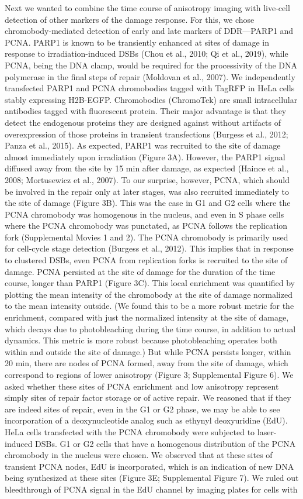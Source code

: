  Next we wanted to combine the time course of anisotropy imaging with live-cell detection of other markers of the damage response. For this, we chose chromobody-mediated detection of early and late markers of DDR—PARP1 and PCNA. PARP1 is known to be transiently enhanced at sites of damage in response to irradiation-induced DSBs (Chou et al., 2010; Qi et al., 2019), while PCNA, being the DNA clamp, would be required for the processivity of the DNA polymerase in the final steps of repair (Moldovan et al., 2007). We independently transfected PARP1 and PCNA chromobodies tagged with TagRFP in HeLa cells stably expressing H2B-EGFP. Chromobodies (ChromoTek) are small intracellular antibodies tagged with fluorescent protein. Their major advantage is that they detect the endogenous proteins they are designed against without artifacts of overexpression of those proteins in transient transfections (Burgess et al., 2012; Panza et al., 2015). As expected, PARP1 was recruited to the site of damage almost immediately upon irradiation (Figure 3A). However, the PARP1 signal diffused away from the site by 15 min after damage, as expected (Haince et al., 2008; Mortusewicz et al., 2007). To our surprise, however, PCNA, which should be involved in the repair only at later stages, was also recruited immediately to the site of damage (Figure 3B). This was the case in G1 and G2 cells where the PCNA chromobody was homogenous in the nucleus, and even in S phase cells where the PCNA chromobody was punctated, as PCNA follows the replication fork (Supplemental Movies 1 and 2). The PCNA chromobody is primarily used for cell-cycle stage detection (Burgess et al., 2012). This implies that in response to clustered DSBs, even PCNA from replication forks is recruited to the site of damage. PCNA persisted at the site of damage for the duration of the time course, longer than PARP1 (Figure 3C). This local enrichment was quantified by plotting the mean intensity of the chromobody at the site of damage normalized to the mean intensity outside. (We found this to be a more robust metric for the enrichment, compared with just the normalized intensity at the site of damage, which decays due to photobleaching during the time course, in addition to actual dynamics. This metric is more robust because photobleaching operates both within and outside the site of damage.) But while PCNA persists longer, within 20 min, there are nodes of PCNA formed, away from the site of damage, which correspond to regions of lower anisotropy (Figure 3; Supplemental Figure 6). We asked whether these sites of PCNA enrichment and low anisotropy represent simply sites of repair factor storage or of active repair. We reasoned that if they are indeed sites of repair, even in the G1 or G2 phase, we may be able to see incorporation of a deoxynucleotide analog such as ethynyl deoxyuridine (EdU). HeLa cells transfected with the PCNA chromobody were subjected to laser-induced DSBs. G1 or G2 cells that have a homogenous distribution of the PCNA chromobody in the nucleus were chosen. We observed that at these sites of transient PCNA nodes, EdU is incorporated, which is an indication of new DNA being synthesized at these sites (Figure 3E; Supplemental Figure 7). We ruled out bleedthrough of PCNA signal in the EdU channel by imaging plates for cells with 